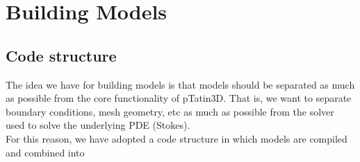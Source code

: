\documentclass[paper=a4, fontsize=11pt,twoside]{scrartcl}
\newcommand{\ptat}{{{\sc pTatin3D}}}
\begin{document}
\newpage
\section{Building Models}

\subsection{Code structure}
The idea we have for building models is that models should be separated as much as possible
from the core functionality of {\ptat}. That is, we want to separate boundary conditions,
mesh geometry, etc as much as possible from the solver used to solve the underlying PDE (Stokes).
\\[8pt]
For this reason, we have adopted a code structure in which models are compiled and combined into
\end{document}
